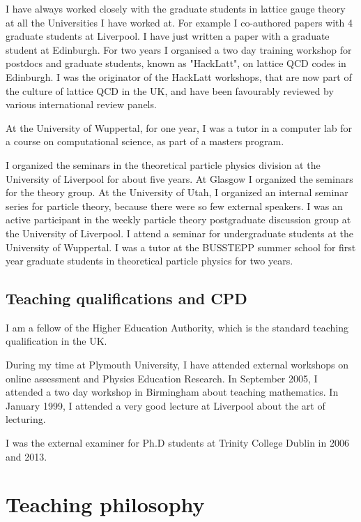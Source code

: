 \documentclass[12pt]{article}
\begin{document}
I have always worked closely with the graduate students in
lattice gauge theory at all the Universities I have worked at. 
For example I co-authored papers with 4 graduate students
at Liverpool. I have just written a paper with a graduate student
at Edinburgh.
For two years I organised a two
day training workshop for postdocs and graduate students, 
known as "HackLatt", on lattice QCD codes in
Edinburgh. I was the originator of the HackLatt workshops, that are
now part of the culture of lattice QCD in the UK, and have been favourably
reviewed by various international review panels.  


At the University of Wuppertal, for one year, I was a tutor in
a computer lab for a course on computational 
science, as part of a masters program.


I organized the seminars in the theoretical particle physics division
at the University of Liverpool for about five years. At Glasgow I
organized the seminars for the theory group.  At the University of
Utah, I organized an internal seminar series for particle theory,
because there were so few external speakers.
I was an active
participant in the weekly particle theory postgraduate discussion
group at the University of Liverpool.
I attend a seminar for undergraduate students at the University
of Wuppertal.
I was a tutor at the BUSSTEPP summer school for first year
graduate students in theoretical particle physics for two years.



\subsection{Teaching qualifications and CPD}

I am a fellow of the Higher Education Authority, which is the standard  teaching
qualification in the UK.

During my time at Plymouth University, I have attended external workshops on online
assessment and Physics Education Research.  In September 2005, I
attended a two day workshop in Birmingham about teaching
mathematics. In January 1999, I attended a very good lecture at
Liverpool about the art of lecturing.

I was the external examiner for Ph.D students
at Trinity College Dublin in 2006 and 2013.


\section{Teaching philosophy} 
\end{document}
